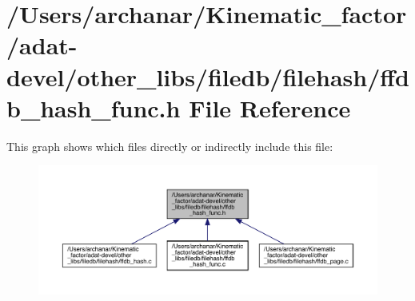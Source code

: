 \hypertarget{adat-devel_2other__libs_2filedb_2filehash_2ffdb__hash__func_8h}{}\section{/\+Users/archanar/\+Kinematic\+\_\+factor/adat-\/devel/other\+\_\+libs/filedb/filehash/ffdb\+\_\+hash\+\_\+func.h File Reference}
\label{adat-devel_2other__libs_2filedb_2filehash_2ffdb__hash__func_8h}
This graph shows which files directly or indirectly include this file\+:
\nopagebreak
\begin{figure}[H]
\begin{center}
\leavevmode
\includegraphics[width=350pt]{da/d02/adat-devel_2other__libs_2filedb_2filehash_2ffdb__hash__func_8h__dep__incl}
\end{center}
\end{figure}
